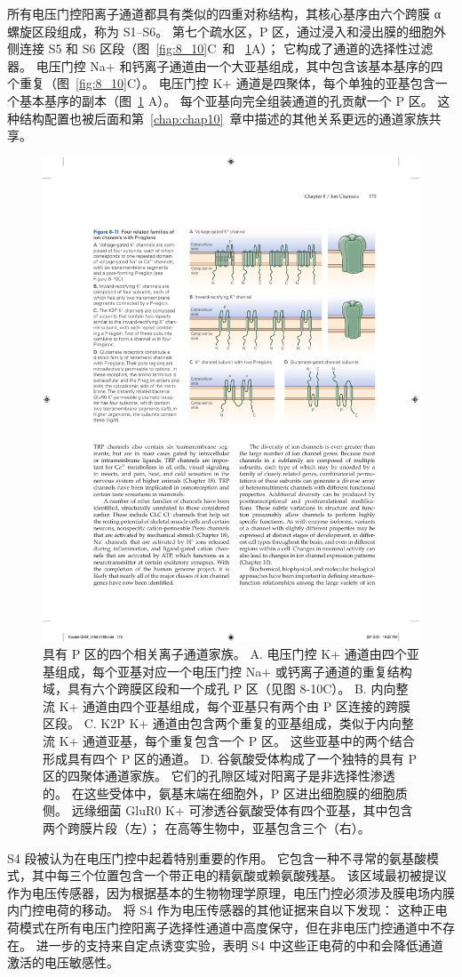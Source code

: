 所有电压门控阳离子通道都具有类似的四重对称结构，其核心基序由六个跨膜 α 螺旋区段组成，称为 S1–S6。
第七个疏水区，P 区，通过浸入和浸出膜的细胞外侧连接 S5 和 S6 区段（图~\ref{fig:8_10}C~和 ~\ref{fig:8_11}A）；
它构成了通道的选择性过滤器。
电压门控 Na+ 和钙离子通道由一个大亚基组成，其中包含该基本基序的四个重复（图~\ref{fig:8_10}C）。 
电压门控 K+ 通道是四聚体，每个单独的亚基包含一个基本基序的副本（图~\ref{fig:8_11} A）。
每个亚基向完全组装通道的孔贡献一个 P 区。
这种结构配置也被后面和第~\ref{chap:chap10}~章中描述的其他关系更远的通道家族共享。


\begin{figure}[htbp]
	\centering
	\includegraphics[width=0.7\linewidth]{chap08/fig_8_11}
	\caption{具有 P 区的四个相关离子通道家族。 A. 电压门控 K+ 通道由四个亚基组成，每个亚基对应一个电压门控 Na+ 或钙离子通道的重复结构域，具有六个跨膜区段和一个成孔 P 区（见图 8-10C）。 B. 内向整流 K+ 通道由四个亚基组成，每个亚基只有两个由 P 区连接的跨膜区段。 C. K2P K+ 通道由包含两个重复的亚基组成，类似于内向整流 K+ 通道亚基，每个重复包含一个 P 区。 这些亚基中的两个结合形成具有四个 P 区的通道。 D. 谷氨酸受体构成了一个独特的具有 P 区的四聚体通道家族。 它们的孔隙区域对阳离子是非选择性渗透的。 在这些受体中，氨基末端在细胞外，P 区进出细胞膜的细胞质侧。 远缘细菌 GluR0 K+ 可渗透谷氨酸受体有四个亚基，其中包含两个跨膜片段（左）； 在高等生物中，亚基包含三个（右）。}
	\label{fig:8_11}
\end{figure}


S4 段被认为在电压门控中起着特别重要的作用。
它包含一种不寻常的氨基酸模式，其中每三个位置包含一个带正电的精氨酸或赖氨酸残基。
该区域最初被提议作为电压传感器，因为根据基本的生物物理学原理，电压门控必须涉及膜电场内膜内门控电荷的移动。
将 S4 作为电压传感器的其他证据来自以下发现：
这种正电荷模式在所有电压门控阳离子选择性通道中高度保守，但在非电压门控通道中不存在。
进一步的支持来自定点诱变实验，表明 S4 中这些正电荷的中和会降低通道激活的电压敏感性。


